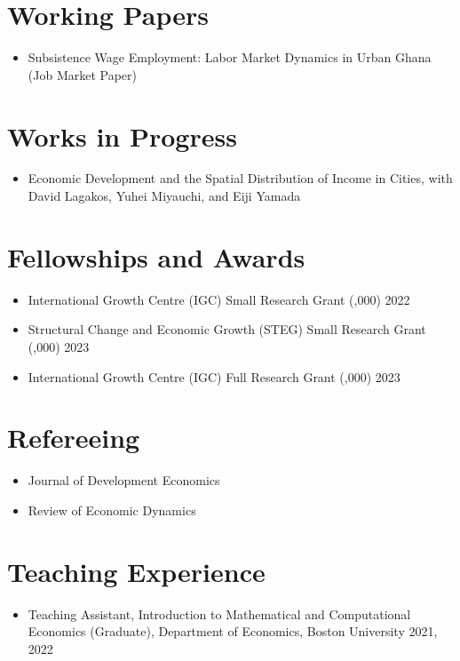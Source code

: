 \documentclass[11pt]{article}
\newenvironment{customitemize}
{ \begin{itemize}[
	leftmargin=\parindent,
	itemindent=-0.5\parindent,
	topsep = 0pt, 
	itemsep = -1pt, 
	label={}] }
{\end{itemize} }
\begin{document}
\section*{Working Papers}
\begin{customitemize}
	\item Subsistence Wage Employment: Labor Market Dynamics in Urban Ghana (Job Market Paper)
\end{customitemize}
\section*{Works in Progress}

\begin{customitemize}
	\item Economic Development and the Spatial Distribution of Income in Cities, with David Lagakos, Yuhei Miyauchi, and Eiji Yamada
\end{customitemize}

\section*{Fellowships and Awards}


\begin{customitemize}
	\item International Growth Centre (IGC) Small Research Grant (,000) \hfill 2022
	\item Structural Change and Economic Growth (STEG) Small Research Grant (,000) \hfill 2023
	\item International Growth Centre (IGC) Full Research Grant (,000) \hfill 2023
\end{customitemize}

\section*{Refereeing}


\begin{customitemize}
	\item Journal of Development Economics
	\item Review of Economic Dynamics
\end{customitemize}

\section*{Teaching Experience}

\begin{customitemize}
	\item Teaching Assistant, Introduction to Mathematical and Computational Economics (Graduate), Department of Economics, Boston University \hfill 2021, 2022
\end{customitemize}
\end{document}
